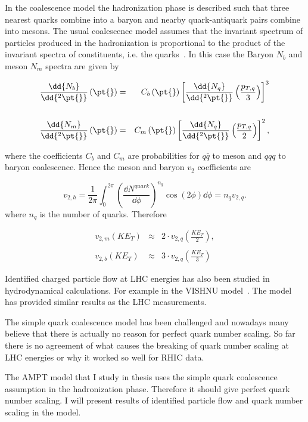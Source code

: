 In the coalescence model the hadronization phase is described such that three nearest quarks combine into a baryon and nearby quark-antiquark pairs combine into mesons. The usual coalescence model assumes that the invariant spectrum of particles produced in the hadronization is proportional to the product of the invariant spectra of constituents, i.e. the quarks~\cite{Molnar:2003ff}. In this case the Baryon $N_b$ and meson $N_m$ spectra are given by


\begin{eqnarray}
\frac{\dd {N_b}}{\dd{^2 \pt{}}}\left(\pt{}\right) &=& C_b\left(\pt{}\right)\left[\frac{\dd{N_q}}{\dd{^2\pt{}}}\left(\frac{p_{T,q}}{3}\right)\right]^3 \nonumber \\ &&\nonumber\\
\frac{\dd {N_m}}{\dd{^2 \pt{}}}\left(\pt{}\right) &= & C_m\left(\pt{}\right)\left[\frac{\dd {N_q}}{\dd{^2\pt{}}}\left(\frac{p_{T,q}}{2}\right)\right]^2,
\end{eqnarray}

\noindent where the coefficients $C_b$ and $C_m$ are probabilities for $q\bar q$ to meson and $qqq$ to baryon coalescence. Hence the meson and baryon $v_2$ coefficients are

\begin{equation}
v_{2,h}=\frac{1}{2\pi}\int_0^{2\pi}\left(\frac{\dd{N^{quark}}}{\dd \phi}\right)^{n_q} \cos\left(2\phi \right)\dd \phi = n_q v_{2,q}.
\end{equation} 
where $n_q$ is the number of quarks. %
Therefore 

\begin{eqnarray}
v_{2,m}\left(KE_T\right)&\approx& 2\cdot v_{2,q}\left(\frac{KE_T}{2}\right), \nonumber \\ &&\nonumber\\
v_{2,b}\left(KE_T\right)&\approx& 3\cdot v_{2,q}\left(\frac{KE_T}{3}\right)
\end{eqnarray}

Identified charged particle flow at LHC energies has also been studied in hydrodynamical calculations. For example in the VISHNU model~\cite{Song:2013qma}. The model has provided similar results as the LHC measurements.

The simple quark coalescence model has been challenged and nowadays many believe that there is actually no reason for perfect quark number scaling. So far there is no agreement of what causes the breaking of quark number scaling at LHC energies or why it worked so well for RHIC data.

The AMPT model that I study in thesis uses the simple quark coalescence assumption in the hadronization phase. Therefore it should give perfect quark number scaling. I will present results of identified particle flow and quark number scaling in the model.

